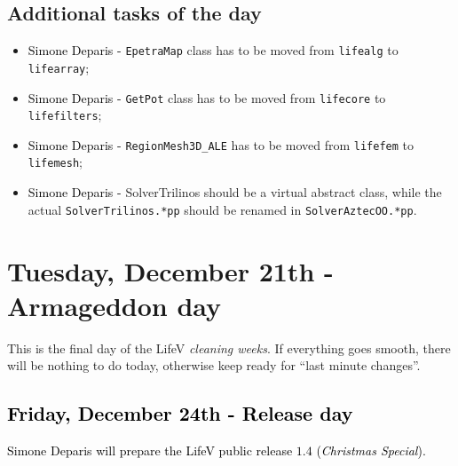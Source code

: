 \documentclass[10p]{article}
\newcommand{\newparts}[1]{\textcolor{black}{#1}}
\theoremstyle{definition}
\begin{document}

\subsection*{Additional tasks of the day}
\begin{itemize}
  \item \newparts{Simone Deparis -} \texttt{EpetraMap} class has to be moved from \texttt{lifealg} to \texttt{lifearray}; 
  \item \newparts{Simone Deparis -} \texttt{GetPot} class has to be moved from \texttt{lifecore} to \texttt{lifefilters};
  \item \newparts{Simone Deparis -} \texttt{RegionMesh3D\_ALE} has to be moved from \texttt{lifefem} to \texttt{lifemesh}; 
  \item \newparts{Simone Deparis -} SolverTrilinos should be a virtual abstract class, while the actual \texttt{SolverTrilinos.*pp} should be renamed in \texttt{SolverAztecOO.*pp}. 
\end{itemize}


\section*{Tuesday, December 21th - Armageddon day}
This is the final day of the LifeV \emph{cleaning weeks}. If everything goes smooth, there will be nothing to do today, otherwise keep ready for ``last minute changes''.

\newparts{
\section*{Friday, December 24th - Release day}
Simone Deparis will prepare the LifeV public release $1.4$ (\emph{Christmas Special}).}
\end{document}
